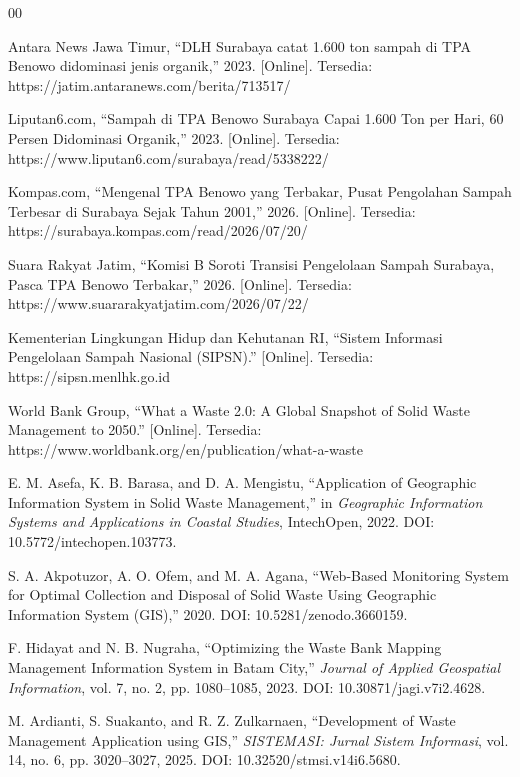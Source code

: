 \documentclass[conference]{IEEEtran}
\begin{document}
\begin{thebibliography}{00}

     Antara News Jawa Timur, ``DLH Surabaya catat 1.600 ton sampah di TPA Benowo didominasi jenis organik,'' 2023. [Online]. Tersedia: https://jatim.antaranews.com/berita/713517/

     Liputan6.com, ``Sampah di TPA Benowo Surabaya Capai 1.600 Ton per Hari, 60 Persen Didominasi Organik,'' 2023. [Online]. Tersedia: https://www.liputan6.com/surabaya/read/5338222/

     Kompas.com, ``Mengenal TPA Benowo yang Terbakar, Pusat Pengolahan Sampah Terbesar di Surabaya Sejak Tahun 2001,'' 2026. [Online]. Tersedia: https://surabaya.kompas.com/read/2026/07/20/

     Suara Rakyat Jatim, ``Komisi B Soroti Transisi Pengelolaan Sampah Surabaya, Pasca TPA Benowo Terbakar,'' 2026. [Online]. Tersedia: https://www.suararakyatjatim.com/2026/07/22/

     Kementerian Lingkungan Hidup dan Kehutanan RI, ``Sistem Informasi Pengelolaan Sampah Nasional (SIPSN).'' [Online]. Tersedia: https://sipsn.menlhk.go.id

     World Bank Group, ``What a Waste 2.0: A Global Snapshot of Solid Waste Management to 2050.'' [Online]. Tersedia: https://www.worldbank.org/en/publication/what-a-waste

     E. M. Asefa, K. B. Barasa, and D. A. Mengistu, ``Application of Geographic Information System in Solid Waste Management,'' in \textit{Geographic Information Systems and Applications in Coastal Studies}, IntechOpen, 2022. DOI: 10.5772/intechopen.103773.

     S. A. Akpotuzor, A. O. Ofem, and M. A. Agana, ``Web-Based Monitoring System for Optimal Collection and Disposal of Solid Waste Using Geographic Information System (GIS),'' 2020. DOI: 10.5281/zenodo.3660159.

     F. Hidayat and N. B. Nugraha, ``Optimizing the Waste Bank Mapping Management Information System in Batam City,'' \textit{Journal of Applied Geospatial Information}, vol. 7, no. 2, pp. 1080--1085, 2023. DOI: 10.30871/jagi.v7i2.4628.

     M. Ardianti, S. Suakanto, and R. Z. Zulkarnaen, ``Development of Waste Management Application using GIS,'' \textit{SISTEMASI: Jurnal Sistem Informasi}, vol. 14, no. 6, pp. 3020--3027, 2025. DOI: 10.32520/stmsi.v14i6.5680.


\end{thebibliography}
\end{document}
